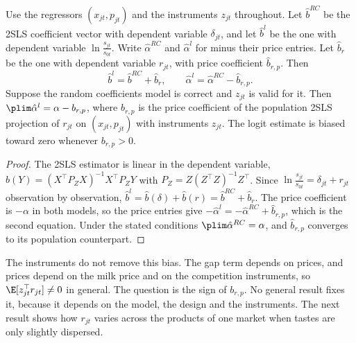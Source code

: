 \begin{proposition}\label{prop:C-logit-bias}
Use the regressors $(x_{jt}, p_{jt})$ and the instruments $z_{jt}$ throughout. Let $\hat b^{RC}$ be the 2SLS coefficient
vector with dependent variable $\delta_{jt}$, and let $\hat b^l$ be the one with dependent variable $\ln\frac{s_{jt}}{s_{0t}}$.
Write $\hat\alpha^{RC}$ and $\hat\alpha^l$ for minus their price entries. Let $\hat b_r$ be the one with dependent
variable $r_{jt}$, with price coefficient $\hat b_{r,p}$. Then
\begin{equation}\label{eq:C-decomp}
  \hat b^l = \hat b^{RC} + \hat b_r, \qquad \hat\alpha^l = \hat\alpha^{RC} - \hat b_{r,p}.
\end{equation}
Suppose the random coefficients model is correct and $z_{jt}$ is valid for it. Then $\plim\hat\alpha^l = \alpha - b_{r,p}$,
where $b_{r,p}$ is the price coefficient of the population 2SLS projection of $r_{jt}$ on $(x_{jt}, p_{jt})$ with
instruments $z_{jt}$. The logit estimate is biased toward zero whenever $b_{r,p} > 0$.
\end{proposition}

\begin{proof}
The 2SLS estimator is linear in the dependent variable, $\hat b(Y) = (X^\top P_ZX)^{-1}X^\top P_ZY$ with
$P_Z = Z(Z^\top Z)^{-1}Z^\top$. Since $\ln\frac{s_{jt}}{s_{0t}} = \delta_{jt} + r_{jt}$ observation by observation,
$\hat b^l = \hat b(\delta) + \hat b(r) = \hat b^{RC} + \hat b_r$. The price coefficient is $-\alpha$ in both models, so
the price entries give $-\hat\alpha^l = -\hat\alpha^{RC} + \hat b_{r,p}$, which is the second equation. Under the
stated conditions $\plim\hat\alpha^{RC} = \alpha$, and $\hat b_{r,p}$ converges to its population counterpart.
\end{proof}

The instruments do not remove this bias. The gap term depends on prices, and prices depend on the milk price and on the
competition instruments, so $\E[z_{jt}^\top r_{jt}] \ne 0$ in general. The question is the sign of $b_{r,p}$. No general
result fixes it, because it depends on the model, the design and the instruments. The next result shows how $r_{jt}$
varies across the products of one market when tastes are only slightly dispersed.

